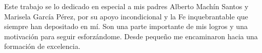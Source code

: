 \begin{dedication}
    Este trabajo se lo dedicado en especial a mis padres Alberto Mach\'in Santos y Marisela García P\'erez, por su apoyo incondicional y la Fe inquebrantable que siempre han depositado en m\'i. Son una parte importante de mis logros y una motivaci\'on para seguir esforz\'andome. Desde peque\~no me encaminaron hacia una formaci\'on de excelencia.
\end{dedication}